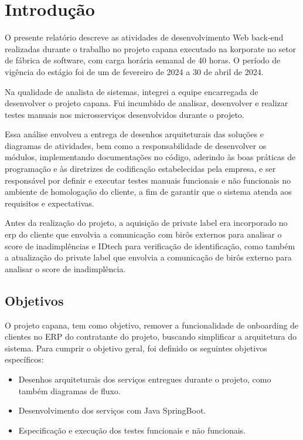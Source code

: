 \chapter{Introdução}
\label{Introdução}

O presente relatório descreve as atividades de desenvolvimento Web back-end 
realizadas durante o trabalho no projeto capana executado na korporate no setor de 
fábrica de software, com carga horária semanal de 40 horas. O período de vigência 
do estágio foi de um de fevereiro de 2024 a 30 de abril de 2024. 

Na qualidade de analista de sistemas, integrei a equipe encarregada de desenvolver 
o projeto capana. Fui incumbido de analisar, desenvolver e realizar testes manuais 
nos microsserviços desenvolvidos durante o projeto.

Essa análise envolveu a entrega de desenhos arquiteturais das soluções e diagramas 
de atividades, bem como a responsabilidade de desenvolver os módulos, implementando 
documentações no código, aderindo às boas práticas de programação e às diretrizes 
de codificação estabelecidas pela empresa, e ser responsável por definir e executar 
testes manuais funcionais e não funcionais no ambiente de homologação do cliente, 
a fim de garantir que o sistema atenda aos requisitos e expectativas.

Antes da realização do projeto, a aquisição de private label era incorporado no 
erp do cliente que envolvia a comunicação com birôs externos para analisar o score 
de inadimplências e IDtech para verificação de identificação, como também a 
atualização do private label que envolvia a comunicação de birôs externo para 
analisar o score de inadimplência.

\section{Objetivos}

O projeto capana, tem como objetivo, remover a funcionalidade de onboarding de 
clientes no ERP do contratante do projeto, buscando simplificar a arquitetura do 
sistema. Para cumprir o objetivo geral, foi definido os seguintes objetivos 
específicos:

\begin{itemize}

    \item Desenhos arquiteturais dos serviços entregues durante o projeto, como 
    também diagramas de fluxo.
    \item Desenvolvimento dos serviços com Java SpringBoot.
    \item Especificação e execução dos testes funcionais e não funcionais.

\end{itemize}

